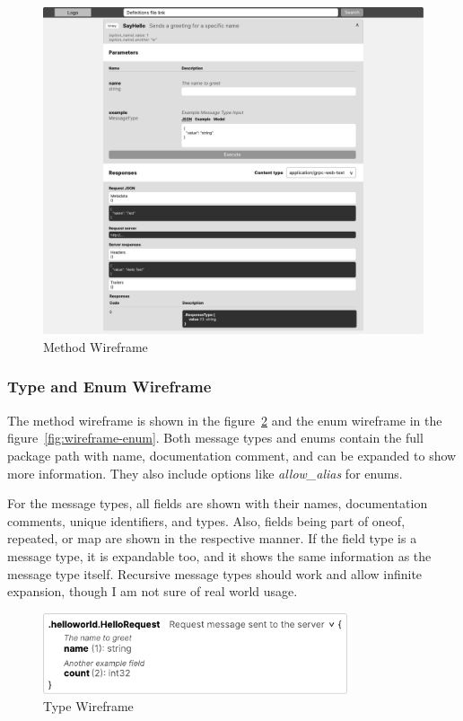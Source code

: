\begin{figure}[hbt!]
    \centering
    \captionsetup{justification=centering}
    \includegraphics[width=1.0\textwidth]{images/design/wireframes/method}
    \caption{Method Wireframe}
    \label{fig:wireframe-method}
\end{figure}

\subsubsection{Type and Enum Wireframe}
The method wireframe is shown in the figure~\ref{fig:wireframe-type} and the enum wireframe in the figure~\ref{fig:wireframe-enum}.
Both message types and enums contain the full package path with name, documentation comment, and can be expanded to show more information.
They also include options like \textit{allow\_alias} for enums.

For the message types, all fields are shown with their names, documentation comments, unique identifiers, and types.
Also, fields being part of oneof, repeated, or map are shown in the respective manner.
If the field type is a message type, it is expandable too, and it shows the same information as the message type itself.
Recursive message types should work and allow infinite expansion, though I am not sure of real world usage.

\begin{figure}[hbt!]
    \centering
    \captionsetup{justification=centering}
    \includegraphics[width=0.8\textwidth]{images/design/wireframes/type}
    \caption{Type Wireframe}
    \label{fig:wireframe-type}
\end{figure}


